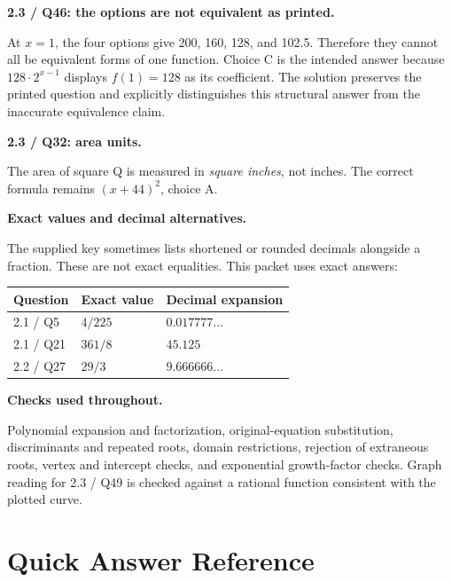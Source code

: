 \documentclass[11pt]{article}
\begin{document}
\textbf{2.3 / Q46: the options are not equivalent as printed.}\par
At $x=1$, the four options give 200, 160, 128, and 102.5. Therefore they cannot all be equivalent forms of one function. Choice C is the intended answer because $128\cdot2^{x-1}$ displays $f(1)=128$ as its coefficient. The solution preserves the printed question and explicitly distinguishes this structural answer from the inaccurate equivalence claim.

\textbf{2.3 / Q32: area units.}\par
The area of square Q is measured in \emph{square inches}, not inches. The correct formula remains $(x+44)^2$, choice A.

\textbf{Exact values and decimal alternatives.}\par
The supplied key sometimes lists shortened or rounded decimals alongside a fraction. These are not exact equalities. This packet uses exact answers:
\begin{center}\renewcommand{\arraystretch}{1.4}\begin{tabular}{lll}\toprule
Question & Exact value & Decimal expansion \\\midrule
2.1 / Q5 & $4/225$ & $0.017777\ldots$ \\
2.1 / Q21 & $361/8$ & $45.125$ \\
2.2 / Q27 & $29/3$ & $9.666666\ldots$ \\\bottomrule
\end{tabular}\end{center}
\textbf{Checks used throughout.}\par
Polynomial expansion and factorization, original-equation substitution, discriminants and repeated roots, domain restrictions, rejection of extraneous roots, vertex and intercept checks, and exponential growth-factor checks. Graph reading for 2.3 / Q49 is checked against a rational function consistent with the plotted curve.
\clearpage\section*{Quick Answer Reference}
\end{document}

